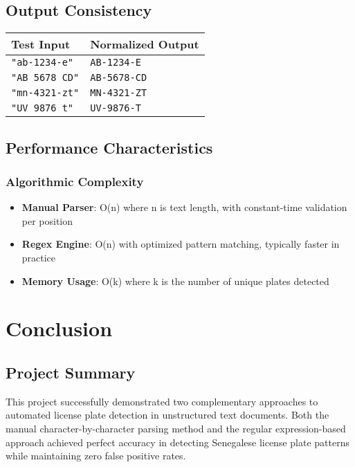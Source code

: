 \documentclass[12pt,a4paper]{article}
\begin{document}
\subsection{Output Consistency}
\begin{center}
\begin{tabular}{|l|l|}
\hline
\textbf{Test Input} & \textbf{Normalized Output} \\
\hline
\texttt{"ab-1234-e"} & \texttt{AB-1234-E} \\
\texttt{"AB 5678 CD"} & \texttt{AB-5678-CD} \\
\texttt{"mn-4321-zt"} & \texttt{MN-4321-ZT} \\
\texttt{"UV 9876 t"} & \texttt{UV-9876-T} \\
\hline
\end{tabular}
\end{center}

\subsection{Performance Characteristics}
\subsubsection{Algorithmic Complexity}
\begin{itemize}
    \item \textbf{Manual Parser}: O(n) where n is text length, with constant-time validation per position
    \item \textbf{Regex Engine}: O(n) with optimized pattern matching, typically faster in practice
    \item \textbf{Memory Usage}: O(k) where k is the number of unique plates detected
\end{itemize}

\section{Conclusion}
\subsection{Project Summary}
This project successfully demonstrated two complementary approaches to automated license plate detection in unstructured text documents. Both the manual character-by-character parsing method and the regular expression-based approach achieved perfect accuracy in detecting Senegalese license plate patterns while maintaining zero false positive rates.
\end{document}
